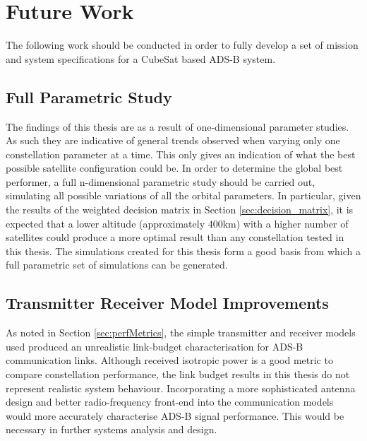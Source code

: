\section{Future Work}
The following work should be conducted in order to fully develop a set of mission and system specifications for a CubeSat based ADS-B system.
\subsection{Full Parametric Study}
The findings of this thesis are as a result of one-dimensional parameter studies. As such they are indicative of general trends observed when varying only one constellation parameter at a time. This only gives an indication of what the best possible satellite configuration could be. In order to determine the global best performer, a full n-dimensional parametric study should be carried out, simulating all possible variations of all the orbital parameters.  In particular, given the results of the weighted decision matrix in Section \ref{sec:decision_matrix}, it is expected that a lower altitude (approximately 400km) with a higher number of satellites could produce a more optimal result than any constellation tested in this thesis. The simulations created for this thesis form a good basis from which a full parametric set of simulations can be generated.

\subsection{Transmitter Receiver Model Improvements}
As noted in Section \ref{sec:perfMetrics}, the simple transmitter and receiver models used produced an unrealistic link-budget characterisation for ADS-B communication links. Although received isotropic power is a good metric to compare constellation performance, the link budget results in this thesis do not represent realistic system behaviour. Incorporating a more sophisticated antenna design and better radio-frequency front-end into the communication models would more accurately characterise ADS-B signal performance. This would be necessary in further systems analysis and design.

